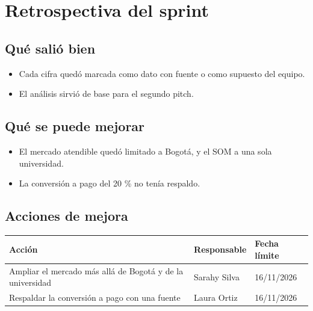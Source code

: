 \documentclass[11pt,a4paper]{article}
\begin{document}
\section{Retrospectiva del sprint}

\subsection{Qué salió bien}
\begin{itemize}[leftmargin=1.5em]
  \item {Cada cifra quedó marcada como dato con fuente o como supuesto del equipo.}
  \item {El análisis sirvió de base para el segundo pitch.}
\end{itemize}

\subsection{Qué se puede mejorar}
\begin{itemize}[leftmargin=1.5em]
  \item {El mercado atendible quedó limitado a Bogotá, y el SOM a una sola universidad.}
  \item {La conversión a pago del 20 \% no tenía respaldo.}
\end{itemize}

\subsection{Acciones de mejora}
\begin{tabularx}{\textwidth}{X l l}
  \toprule
  \textbf{Acción} & \textbf{Responsable} & \textbf{Fecha límite} \\
  \midrule
  Ampliar el mercado más allá de Bogotá y de la universidad & Sarahy Silva & 16/11/2026 \\
  Respaldar la conversión a pago con una fuente & Laura Ortiz & 16/11/2026 \\
  \bottomrule
\end{tabularx}
\end{document}
